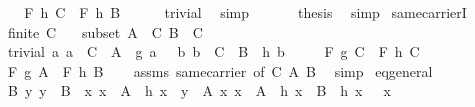 \begin{isabellebody}
\ \ \isamarkupfalse%
\ \isamarkupfalse%
\ {\isachardoublequoteopen}F\ h\ C\ {\isacharequal}{\kern0pt}\ F\ h\ B{\isachardoublequoteclose}\isanewline
\ \ \ \ \isamarkupfalse%
\ trivial\ \isamarkupfalse%
\ simp\isanewline
\ \ \isamarkupfalse%
\ {\isacharasterisk}{\kern0pt}\ \isamarkupfalse%
\ {\isacharquery}{\kern0pt}thesis\ \isamarkupfalse%
\ simp\isanewline
{}\isamarkupfalse%
%
\endisatagproof
{\isafoldproof}%
%
\isadelimproof
\isanewline
%
\endisadelimproof
\isanewline
{}\isamarkupfalse%
\ same{\isacharunderscore}{\kern0pt}carrierI{\isacharcolon}{\kern0pt}\isanewline
\ \ \ {\isachardoublequoteopen}finite\ C{\isachardoublequoteclose}\isanewline
\ \ \ subset{\isacharcolon}{\kern0pt}\ {\isachardoublequoteopen}A\ {\isasymsubseteq}\ C{\isachardoublequoteclose}\ {\isachardoublequoteopen}B\ {\isasymsubseteq}\ C{\isachardoublequoteclose}\isanewline
\ \ \ trivial{\isacharcolon}{\kern0pt}\ {\isachardoublequoteopen}{\isasymAnd}a{\isachardot}{\kern0pt}\ a\ {\isasymin}\ C\ {\isacharminus}{\kern0pt}\ A\ {\isasymLongrightarrow}\ g\ a\ {\isacharequal}{\kern0pt}\ \ {\isachardoublequoteopen}{\isasymAnd}b{\isachardot}{\kern0pt}\ b\ {\isasymin}\ C\ {\isacharminus}{\kern0pt}\ B\ {\isasymLongrightarrow}\ h\ b\ {\isacharequal}{\kern0pt}\ \isanewline
\ \ \ {\isachardoublequoteopen}F\ g\ C\ {\isacharequal}{\kern0pt}\ F\ h\ C{\isachardoublequoteclose}\isanewline
\ \ \ {\isachardoublequoteopen}F\ g\ A\ {\isacharequal}{\kern0pt}\ F\ h\ B{\isachardoublequoteclose}\isanewline
%
\isadelimproof
\ \ %
\endisadelimproof
%
\isatagproof
{}\isamarkupfalse%
\ assms\ same{\isacharunderscore}{\kern0pt}carrier\ {\isacharbrackleft}{\kern0pt}of\ C\ A\ B{\isacharbrackright}{\kern0pt}\ \isamarkupfalse%
\ simp%
\endisatagproof
{\isafoldproof}%
%
\isadelimproof
\isanewline
%
\endisadelimproof
\isanewline
{}\isamarkupfalse%
\ eq{\isacharunderscore}{\kern0pt}general{\isacharcolon}{\kern0pt}\isanewline
\ \ \ B{\isacharcolon}{\kern0pt}\ {\isachardoublequoteopen}{\isasymAnd}y{\isachardot}{\kern0pt}\ y\ {\isasymin}\ B\ {\isasymLongrightarrow}\ {\isasymexists}{\isacharbang}{\kern0pt}x{\isachardot}{\kern0pt}\ x\ {\isasymin}\ A\ {\isasymand}\ h\ x\ {\isacharequal}{\kern0pt}\ y{\isachardoublequoteclose}\ \ A{\isacharcolon}{\kern0pt}\ {\isachardoublequoteopen}{\isasymAnd}x{\isachardot}{\kern0pt}\ x\ {\isasymin}\ A\ {\isasymLongrightarrow}\ h\ x\ {\isasymin}\ B\ {\isasymand}\ {\isasymgamma}{\isacharparenleft}{\kern0pt}h\ x{\isacharparenright}{\kern0pt}\ {\isacharequal}{\kern0pt}\ {\isasymphi}\ x{\isachardoublequoteclose}\isanewline

\end{isabellebody}
